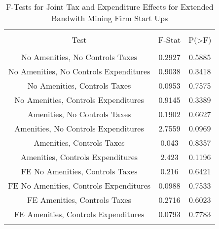 
\begin{table}[!htbp] \centering 
  \caption{F-Tests for Joint Tax and Expenditure Effects for Extended Bandwith Mining Firm Start Ups} 
  \label{21Ftests} 
\begin{tabular}{@{\extracolsep{5pt}} ccc} 
\\[-1.8ex]\hline 
\hline \\[-1.8ex] 
Test & F-Stat & P(\textgreater F) \\ 
\hline \\[-1.8ex] 
No Amenities, No Controls Taxes & 0.2927 & 0.5885 \\ 
No Amenities, No Controls Expenditures & 0.9038 & 0.3418 \\ 
No Amenities, Controls Taxes & 0.0953 & 0.7575 \\ 
No Amenities, Controls Expenditures & 0.9145 & 0.3389 \\ 
Amenities, No Controls Taxes & 0.1902 & 0.6627 \\ 
Amenities, No Controls Expenditures & 2.7559 & 0.0969 \\ 
Amenities, Controls Taxes & 0.043 & 0.8357 \\ 
Amenities, Controls Expenditures & 2.423 & 0.1196 \\ 
FE No Amenities, Controls Taxes & 0.216 & 0.6421 \\ 
FE No Amenities, Controls Expenditures & 0.0988 & 0.7533 \\ 
FE Amenities, Controls Taxes & 0.2716 & 0.6023 \\ 
FE Amenities, Controls Expenditures & 0.0793 & 0.7783 \\ 
\hline \\[-1.8ex] 
\end{tabular} 
\end{table} 
